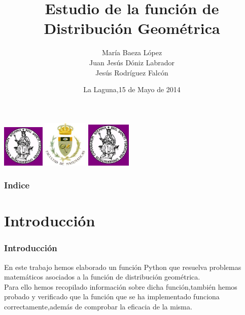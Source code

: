 \documentclass{beamer}
\title[Distribución Geométrica]{Estudio de la función de Distribución Geométrica}
\author[M.Baeza,J.J.Dóniz,J.Rdguez]{
        María Baeza López\\
        Juan Jesús Dóniz Labrador \\
        Jesús Rodríguez Falcón\\
      }
\institute{Matemáticas}
\date[15/05/2014  ULL]{La Laguna,15 de Mayo de 2014}
\begin{document}
\begin{frame}
\includegraphics[width=0.15\textwidth]{img/ullesc.jpg}
  \hspace*{3cm}
  \includegraphics[width=0.16\textwidth]{img/fmatesc.jpg}
  \hspace*{3cm}
  \includegraphics[width=0.16\textwidth]{img/ullesc.jpg}
\titlepage
\end {frame}
\begin{frame}
\frametitle{Indice}
\tableofcontents[pausesections]
\end {frame}
\section {Introducción}
\begin{frame}
\frametitle{Introducción}
En este trabajo hemos elaborado un función Python que resuelva problemas matemáticos asociados a la función de distribución geométrica. \\

Para ello hemos recopilado información sobre dicha función,también hemos probado y verificado que la función que se ha implementado funciona correctamente,además de comprobar la eficacia de la misma.
\end {frame}
\end{document}
